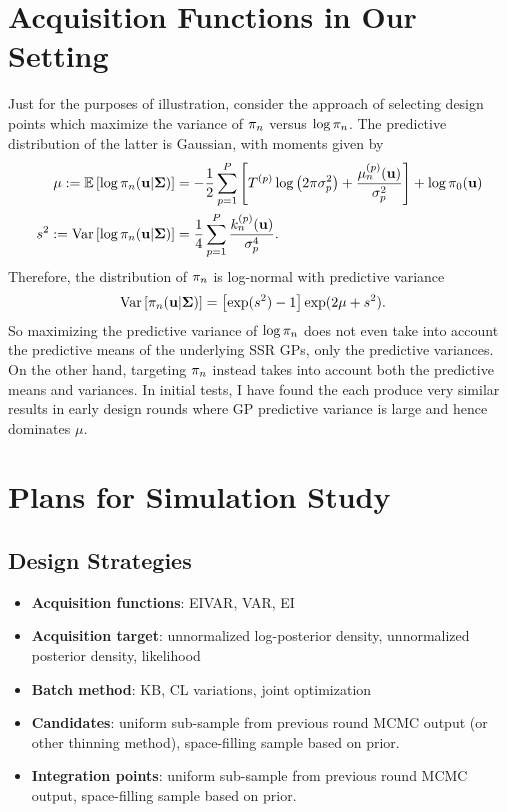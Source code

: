 \documentclass[12pt]{article}
\begin{document}
\begin{enumerate}
\section{Acquisition Functions in Our Setting}
Just for the purposes of illustration, consider the approach of selecting design points which maximize the variance of ${\pi}_{n}$ versus 
$\log {\pi}_{n}$. The predictive distribution of the latter is Gaussian, with moments given by 
\begin{align*}
\mu := \mathbb{E}\left[\log {\pi}_{n}(\mathbf{u}|\boldsymbol{\Sigma})\right] &= -\frac{1}{2} \sum_{p = 1}^{P} \left[{T}^{(p)} \log\left(2\pi \sigma_{p}^2 \right) + \frac{\mu_{n}^{(p)}(\mathbf{u})}{\sigma_{p}^2} \right] + \log \pi_0(\mathbf{u}) \\
s^2 := \mathrm{Var}\left[\log {\pi}_{n}(\mathbf{u}|\boldsymbol{\Sigma})\right]  &= \frac{1}{4} \sum_{p = 1}^{P} \frac{k_{n}^{(p)}(\mathbf{u})}{\sigma_{p}^4}.
\end{align*}
Therefore, the distribution of ${\pi}_{n}$ is log-normal with predictive variance 
\begin{align*}
\mathrm{Var}\left[{\pi}_{n}(\mathbf{u}|\boldsymbol{\Sigma})\right] &= \left[\exp(s^2) - 1 \right]\exp(2\mu + s^2).
\end{align*}
So maximizing the predictive variance of $\log {\pi}_{n}$ does not even take into account the predictive means of the underlying SSR GPs, only the 
predictive variances. On the other hand, targeting ${\pi}_{n}$ instead takes into account both the predictive means and variances. In initial tests, I have 
found the each produce very similar results in early design rounds where GP predictive variance is large and hence dominates $\mu$. 


\section{Plans for Simulation Study}

\subsection{Design Strategies}
\begin{itemize}
\item \textbf{Acquisition functions}: EIVAR, VAR, EI
\item \textbf{Acquisition target}: unnormalized log-posterior density, unnormalized posterior density, likelihood 
\item \textbf{Batch method}: KB, CL variations, joint optimization 
\item \textbf{Candidates}: uniform sub-sample from previous round MCMC output (or other thinning method), space-filling sample based on prior. 
\item \textbf{Integration points}: uniform sub-sample from previous round MCMC output, space-filling sample based on prior.
\end{itemize}


\end{enumerate}
\end{document}
